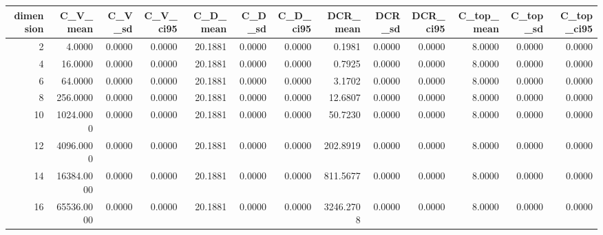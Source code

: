 \begin{tabular}{rrrrrrrrrrrrr}
\toprule
dimension & C_V_mean & C_V_sd & C_V_ci95 & C_D_mean & C_D_sd & C_D_ci95 & DCR_mean & DCR_sd & DCR_ci95 & C_top_mean & C_top_sd & C_top_ci95 \\
\midrule
2 & 4.0000 & 0.0000 & 0.0000 & 20.1881 & 0.0000 & 0.0000 & 0.1981 & 0.0000 & 0.0000 & 8.0000 & 0.0000 & 0.0000 \\
4 & 16.0000 & 0.0000 & 0.0000 & 20.1881 & 0.0000 & 0.0000 & 0.7925 & 0.0000 & 0.0000 & 8.0000 & 0.0000 & 0.0000 \\
6 & 64.0000 & 0.0000 & 0.0000 & 20.1881 & 0.0000 & 0.0000 & 3.1702 & 0.0000 & 0.0000 & 8.0000 & 0.0000 & 0.0000 \\
8 & 256.0000 & 0.0000 & 0.0000 & 20.1881 & 0.0000 & 0.0000 & 12.6807 & 0.0000 & 0.0000 & 8.0000 & 0.0000 & 0.0000 \\
10 & 1024.0000 & 0.0000 & 0.0000 & 20.1881 & 0.0000 & 0.0000 & 50.7230 & 0.0000 & 0.0000 & 8.0000 & 0.0000 & 0.0000 \\
12 & 4096.0000 & 0.0000 & 0.0000 & 20.1881 & 0.0000 & 0.0000 & 202.8919 & 0.0000 & 0.0000 & 8.0000 & 0.0000 & 0.0000 \\
14 & 16384.0000 & 0.0000 & 0.0000 & 20.1881 & 0.0000 & 0.0000 & 811.5677 & 0.0000 & 0.0000 & 8.0000 & 0.0000 & 0.0000 \\
16 & 65536.0000 & 0.0000 & 0.0000 & 20.1881 & 0.0000 & 0.0000 & 3246.2708 & 0.0000 & 0.0000 & 8.0000 & 0.0000 & 0.0000 \\
\bottomrule
\end{tabular}
